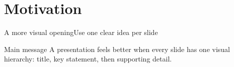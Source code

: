 \section{Motivation}

\begin{frame}{A more visual opening}{Use one clear idea per slide}
  \begin{bigidea}{Main message}
    A presentation feels better when every slide has one visual hierarchy: title, key statement, then supporting detail.
  \end{bigidea}

  \vspace{0.35cm}
\end{frame}
